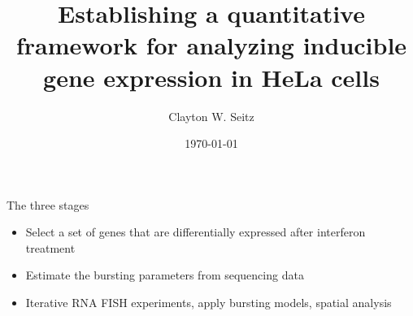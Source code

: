 \documentclass[aspectratio=1610]{beamer}					%
\title{Establishing a quantitative framework for analyzing inducible gene expression in HeLa cells}	%
\author{Clayton W. Seitz}								%
\date{\today}									%
\begin{document}
\begin{frame}
  \titlepage
\end{frame}


%

\begin{frame}{The three stages}
\begin{itemize}
\item Select a set of genes that are differentially expressed after interferon treatment
\item Estimate the bursting parameters from sequencing data
\item Iterative RNA FISH experiments, apply bursting models, spatial analysis
\end{itemize}
\end{frame}
\end{document}
